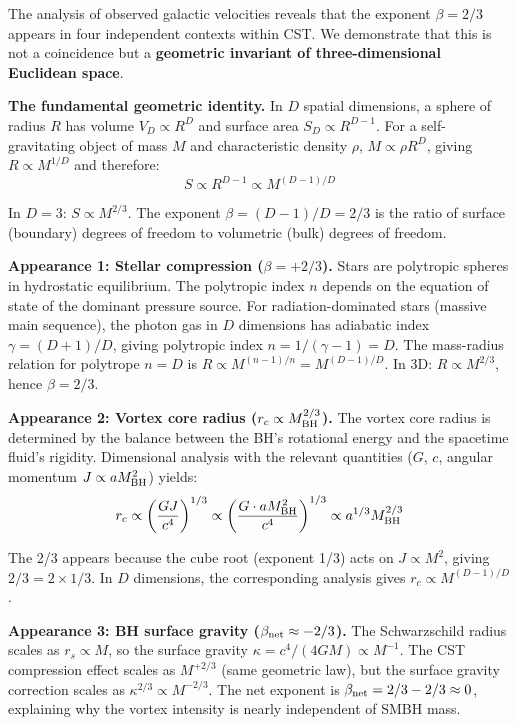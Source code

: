 \documentclass[10pt,a4paper]{article}
\begin{document}
The analysis of observed galactic velocities reveals that the exponent $\beta = 2/3$ appears in four independent contexts within CST. We demonstrate that this is not a coincidence but a \textbf{geometric invariant of three-dimensional Euclidean space}.

\textbf{The fundamental geometric identity.} In $D$ spatial dimensions, a sphere of radius $R$ has volume $V_D \propto R^D$ and surface area $S_D \propto R^{D-1}$. For a self-gravitating object of mass $M$ and characteristic density $\rho$, $M \propto \rho R^D$, giving $R \propto M^{1/D}$ and therefore:
\begin{equation}
S \propto R^{D-1} \propto M^{(D-1)/D}
\end{equation}

In $D = 3$: $S \propto M^{2/3}$. The exponent $\beta = (D-1)/D = 2/3$ is the ratio of surface (boundary) degrees of freedom to volumetric (bulk) degrees of freedom.

\textbf{Appearance 1: Stellar compression ($\beta = +2/3$).} Stars are polytropic spheres in hydrostatic equilibrium. The polytropic index $n$ depends on the equation of state of the dominant pressure source. For radiation-dominated stars (massive main sequence), the photon gas in $D$ dimensions has adiabatic index $\gamma = (D+1)/D$, giving polytropic index $n = 1/(\gamma - 1) = D$. The mass-radius relation for polytrope $n = D$ is $R \propto M^{(n-1)/n} = M^{(D-1)/D}$. In 3D: $R \propto M^{2/3}$, hence $\beta = 2/3$.

\textbf{Appearance 2: Vortex core radius ($r_c \propto M_{\rm BH}^{2/3}$).} The vortex core radius is determined by the balance between the BH's rotational energy and the spacetime fluid's rigidity. Dimensional analysis with the relevant quantities ($G$, $c$, angular momentum $J \propto a M_{\rm BH}^2$) yields:
\begin{equation}
r_c \propto \left(\frac{G J}{c^4}\right)^{1/3} \propto \left(\frac{G \cdot a M_{\rm BH}^2}{c^4}\right)^{1/3} \propto a^{1/3} M_{\rm BH}^{2/3}
\end{equation}

The 2/3 appears because the cube root (exponent 1/3) acts on $J \propto M^2$, giving $2/3 = 2 \times 1/3$. In $D$ dimensions, the corresponding analysis gives $r_c \propto M^{(D-1)/D}$.

\textbf{Appearance 3: BH surface gravity ($\beta_{\rm net} \approx -2/3$).} The Schwarzschild radius scales as $r_s \propto M$, so the surface gravity $\kappa = c^4/(4GM) \propto M^{-1}$. The CST compression effect scales as $M^{+2/3}$ (same geometric law), but the surface gravity correction scales as $\kappa^{2/3} \propto M^{-2/3}$. The net exponent is $\beta_{\rm net} = 2/3 - 2/3 \approx 0$, explaining why the vortex intensity is nearly independent of SMBH mass.
\end{document}
